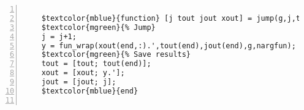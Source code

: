 %  
%  
%  
%  
  
  
\DefineShortVerb[fontfamily=courier,fontseries=m]{\$} 
\DefineShortVerb[fontfamily=courier,fontseries=b]{\#} 
  
\begin{Verbatim}[commandchars=\$\{\},numbers=left,numbersep=2pt] 

    $textcolor{mblue}{function} [j tout jout xout] = jump(g,j,tout,jout,xout,nargfun) 
    $textcolor{mgreen}{% Jump} 
    j = j+1; 
    y = fun_wrap(xout(end,:).',tout(end),jout(end),g,nargfun);  
    $textcolor{mgreen}{% Save results} 
    tout = [tout; tout(end)]; 
    xout = [xout; y.']; 
    jout = [jout; j]; 
    $textcolor{mblue}{end} 
      
\end{Verbatim}  
  
\UndefineShortVerb{\$} 
\UndefineShortVerb{\#} 
 
